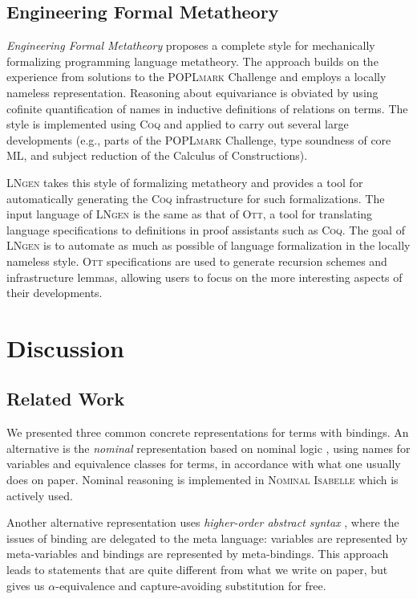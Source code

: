 \documentclass[a4paper,11pt]{article}
\newcommand{\name}[1]{\textsc{#1}\xspace}
\def\Coq{\name{Coq}}
\def\POPLmark{\name{POPLmark}}
\def\LNgen{\name{LNgen}}
\def\Ott{\name{Ott}}
\def\ML{\name{ML}}
\def\NominalIsabelle{\name{Nominal Isabelle}}
\begin{document}
\subsection{Engineering Formal Metatheory}

\emph{Engineering Formal Metatheory} \cite{aydemir-et-al-08} proposes
a complete style for mechanically formalizing programming language
metatheory. The approach builds on the experience from solutions to
the \POPLmark Challenge and employs a locally nameless
representation. Reasoning about equivariance is obviated by using
cofinite quantification of names in inductive definitions of relations
on terms. The style is implemented using \Coq and applied to carry out
several large developments (e.g., parts of the \POPLmark Challenge,
type soundness of core \ML, and subject reduction of the Calculus of
Constructions).

\LNgen \cite{aydemir-weirich-09} takes this style of formalizing
metatheory and provides a tool for automatically generating the
\Coq infrastructure for such formalizations. The input language of
\LNgen is the same as that of \Ott, a tool for translating language
specifications to definitions in proof assistants such as \Coq. The
goal of \LNgen is to automate as much as possible of language
formalization in the locally nameless style. \Ott specifications are
used to generate recursion schemes and infrastructure lemmas, allowing
users to focus on the more interesting aspects of their developments.


\section{Discussion}\label{sec:discussion}


\subsection{Related Work}

We presented three common concrete representations for terms with
bindings. An alternative is the {\em nominal} representation based on
nominal logic \cite{pitts-03}, using names for variables and
equivalence classes for terms, in accordance with what one usually
does on paper. Nominal reasoning is implemented in \NominalIsabelle
\cite{urban-08} which is actively used.

Another alternative representation uses {\em higher-order abstract
  syntax} \cite{capretta-felty-06},
where the issues of binding are delegated to the meta language:
variables are represented by meta-variables and bindings are
represented by meta-bindings. This approach leads to statements that
are quite different from what we write on paper, but gives us
$\alpha$-equivalence and capture-avoiding substitution for free.
\end{document}
